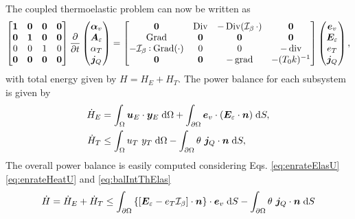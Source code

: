 The coupled thermoelastic problem can now be written as
\begin{equation}\label{eq:phsysElasHeat}
\begin{bmatrix}
\bm{1} & \bm{0} & \bm{0} & \bm{0}\\
\bm{0} & \bm{1} & \bm{0} & \bm{0}\\
0 & 0 & 1 & 0\\
\bm{0} & \bm{0} & \bm{0} & \bm{0}\\
\end{bmatrix}
\diffp{}{t}
\begin{pmatrix}
\bm{\alpha}_v \\
\bm{A}_\varepsilon \\
{\alpha}_T \\
\bm{j}_Q \\
\end{pmatrix} = 
\begin{bmatrix}
\bm{0} & \Div & - \Div(\mathcal{I}_\beta \, \cdot) & \bm{0}\\
\Grad & \bm{0} & \bm{0} & \bm{0} \\
- \mathcal{I}_\beta \cddot  \Grad(\cdot) & 0 & 0 & -\div \\
\bm{0} & \bm{0} & -\grad & - (T_0 k)^{-1} \\
\end{bmatrix}
\begin{pmatrix}
\bm{e}_v \\
\bm{E}_\varepsilon \\
{e}_T \\
\bm{j}_Q \\
\end{pmatrix},
\end{equation}
with total energy given by $H=H_E + H_T$. The power balance for each subsystem is given by 
\begin{align}
\dot{H}_E &= \int_\Omega \bm{u}_E \cdot \bm{y}_E \d\Omega + \int_{\partial\Omega} \bm{e}_v \cdot (\bm{E}_\varepsilon \cdot \bm{n}) \d{S}, \label{eq:enrateElasU} \\
\dot{H}_T &\le \int_\Omega u_T \ y_T \d\Omega - \int_{\partial\Omega} \theta \ \bm{j}_Q \cdot \bm{n} \d{S}, \label{eq:enrateHeatU}
\end{align}
The overall power balance is easily computed considering Eqs. \eqref{eq:enrateElasU} \eqref{eq:enrateHeatU} and \eqref{eq:balIntThElas}
\begin{equation}\label{eq:enrateIntThElas}
\begin{aligned}
\dot{H} = \dot{H}_E + \dot{H}_T \le \int_{\partial \Omega} \left\{\left[\bm{E}_\varepsilon - e_T \mathcal{I}_\beta \right] \cdot \bm{n}\right\}  \cdot \bm{e}_v  \d{S} - \int_{\partial\Omega} \theta \ \bm{j}_Q \cdot \bm{n} \d{S}
\end{aligned}
\end{equation}
